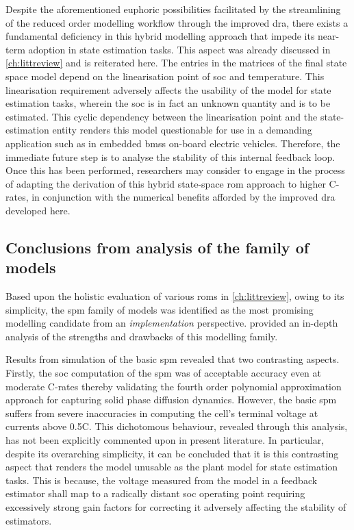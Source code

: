 
Despite   the  aforementioned   euphoric   possibilities   facilitated  by   the
streamlining  of  the reduced  order  modelling  workflow through  the  improved
\gls{dra},  there  exists a  fundamental  deficiency  in this  hybrid  modelling
approach  that impede  its near-term  adoption in  state estimation  tasks. This
aspect was already discussed in \cref{ch:littreview} and is reiterated here. The
entries  in  the  matrices  of  the  final  state  space  model  depend  on  the
linearisation point of \gls{soc} and temperature. This linearisation requirement
adversely affects the usability of the model for state estimation tasks, wherein
the \gls{soc} is in fact an unknown quantity and is to be estimated. This cyclic
dependency  between  the linearisation  point  and  the state-estimation  entity
renders this  model questionable for use  in a demanding application  such as in
embedded \glspl{bms} on-board electric vehicles. Therefore, the immediate future
step is to analyse  the stability of this internal feedback  loop. Once this has
been performed,  researchers may consider to  engage in the process  of adapting
the derivation of this hybrid  state-space \gls{rom} approach to higher C-rates,
in conjunction  with the numerical  benefits afforded by the  improved \gls{dra}
developed here.

\subsection{Conclusions from analysis of the  family of models}

Based    upon   the    holistic   evaluation    of   various    \glspl{rom}   in
\cref{ch:littreview},  owing   to  its  simplicity,  the   \gls{spm}  family  of
models  was  identified  as  the  most promising  modelling  candidate  from  an
\emph{implementation}  perspective.   provided an  in-depth
analysis of the strengths and drawbacks of this modelling family.

Results from  simulation of  the basic \gls{spm}  revealed that  two contrasting
aspects. Firstly, the  \gls{soc} computation of the \gls{spm}  was of acceptable
accuracy even at moderate C-rates thereby validating the fourth order polynomial
approximation approach  for capturing  solid phase diffusion  dynamics. However,
the basic  \gls{spm} suffers  from severe inaccuracies  in computing  the cell's
terminal voltage  at currents above  0.5C. This dichotomous  behaviour, revealed
through  this  analysis, has  not  been  explicitly  commented upon  in  present
literature.  In  particular,  despite  its overarching  simplicity,  it  can  be
concluded that it is this contrasting  aspect that renders the model unusable as
the  plant model  for  state  estimation tasks.  This  is  because, the  voltage
measured  from the  model  in a  feedback  estimator shall  map  to a  radically
distant \gls{soc} operating point requiring  excessively strong gain factors for
correcting it adversely affecting the stability of estimators.

